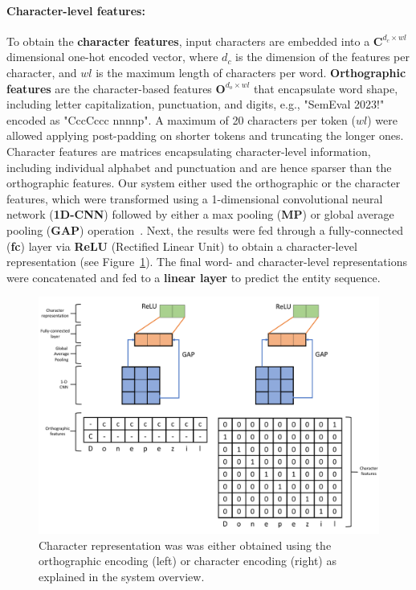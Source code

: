 \documentclass[11pt]{article}
\begin{document}
\paragraph{Character-level features: } 
\label{par:char_features}
%
To obtain the \textbf{character features}, input characters are embedded into a $\mathbf{C}^{d_{c} \times wl}$ dimensional one-hot encoded vector, where $d_{c}$ is the dimension of the features per character, and $wl$ is the maximum length of characters per word.
\textbf{Orthographic features} are the character-based features $\mathbf{O}^{d_{o} \times wl}$ that encapsulate word shape, including letter capitalization, punctuation, and digits, e.g., "SemEval 2023!" encoded as "CccCccc nnnnp". 
A maximum of 20 characters per token ($wl$) were allowed applying post-padding on shorter tokens and truncating the longer ones.
Character features are matrices encapsulating character-level information, including individual alphabet and punctuation and are hence sparser than the orthographic features.
Our system either used the orthographic or the character features, which were transformed using a 1-dimensional convolutional neural network (\textbf{1D-CNN}) followed by either a max pooling (\textbf{MP}) or global average pooling (\textbf{GAP}) operation~\cite{zhou2016learning}.
Next, the results were fed through a fully-connected (\textbf{fc}) layer via \textbf{ReLU} (Rectified Linear Unit) to obtain a character-level representation (see Figure~\ref{fig:task2_char}).
The final word- and character-level representations were concatenated and fed to a \textbf{linear layer} to predict the entity sequence.
%
%
%
\begin{figure}[!htbp]
    \centering
    \includegraphics[width=0.95\columnwidth]{figures/word_arch2.pdf}
    \caption{Character representation was was either obtained using the orthographic encoding (left) or character encoding (right) as explained in the system overview.}
    \label{fig:task2_char}
\end{figure}
%
%
%
\end{document}
